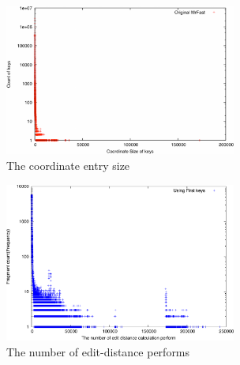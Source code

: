 \begin{figure}[t] 
\centering
\vspace{0.1in}
\includegraphics[width=3in]{./figure/Entry_Size_B.pdf} \vspace{0in}
\caption{The coordinate entry size}
\label{fig:entry_size} 
\end{figure}

\begin{figure}[t] 
\centering
\vspace{0.1in}
\includegraphics[width=3in]{./figure/Edit_Dist_B.pdf} \vspace{0in}
\caption{The number of edit-distance performs}
\label{fig:edit_dist} 
\end{figure}

